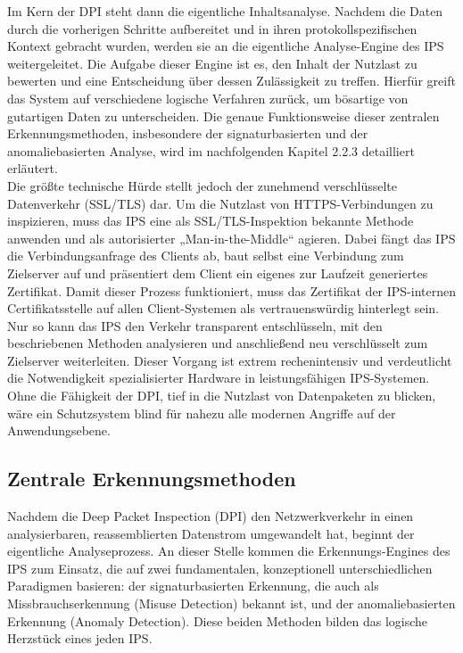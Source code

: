 Im Kern der DPI steht dann die eigentliche Inhaltsanalyse. Nachdem die Daten durch die vorherigen Schritte aufbereitet und in ihren protokollspezifischen Kontext gebracht wurden, werden sie an die eigentliche Analyse-Engine des IPS weitergeleitet. Die Aufgabe dieser Engine ist es, den Inhalt der Nutzlast zu bewerten und eine Entscheidung über dessen Zulässigkeit zu treffen. Hierfür greift das System auf verschiedene logische Verfahren zurück, um bösartige von gutartigen Daten zu unterscheiden. Die genaue Funktionsweise dieser zentralen Erkennungsmethoden, insbesondere der signaturbasierten und der anomaliebasierten Analyse, wird im nachfolgenden Kapitel 2.2.3 detailliert erläutert.\\

Die größte technische Hürde stellt jedoch der zunehmend verschlüsselte Datenverkehr (SSL/TLS) dar. Um die Nutzlast von HTTPS-Verbindungen zu inspizieren, muss das IPS eine als SSL/TLS-Inspektion bekannte Methode anwenden und als autorisierter „Man-in-the-Middle“ agieren. Dabei fängt das IPS die Verbindungsanfrage des Clients ab, baut selbst eine Verbindung zum Zielserver auf und präsentiert dem Client ein eigenes zur Laufzeit generiertes Zertifikat. Damit dieser Prozess funktioniert, muss das Zertifikat der IPS-internen Certifikatsstelle auf allen Client-Systemen als vertrauenswürdig hinterlegt sein. Nur so kann das IPS den Verkehr transparent entschlüsseln, mit den beschriebenen Methoden analysieren und anschließend neu verschlüsselt zum Zielserver weiterleiten. Dieser Vorgang ist extrem rechenintensiv und verdeutlicht die Notwendigkeit spezialisierter Hardware in leistungsfähigen IPS-Systemen. Ohne die Fähigkeit der DPI, tief in die Nutzlast von Datenpaketen zu blicken, wäre ein Schutzsystem blind für nahezu alle modernen Angriffe auf der Anwendungsebene. \cite{NIST1,Claudia1}

\subsection{Zentrale Erkennungsmethoden}
Nachdem die Deep Packet Inspection (DPI) den Netzwerkverkehr in einen analysierbaren, reassemblierten Datenstrom umgewandelt hat, beginnt der eigentliche Analyseprozess. An dieser Stelle kommen die Erkennungs-Engines des IPS zum Einsatz, die auf zwei fundamentalen, konzeptionell unterschiedlichen Paradigmen basieren: der signaturbasierten Erkennung, die auch als Missbrauchserkennung (Misuse Detection) bekannt ist, und der anomaliebasierten Erkennung (Anomaly Detection). Diese beiden Methoden bilden das logische Herzstück eines jeden IPS.\\

